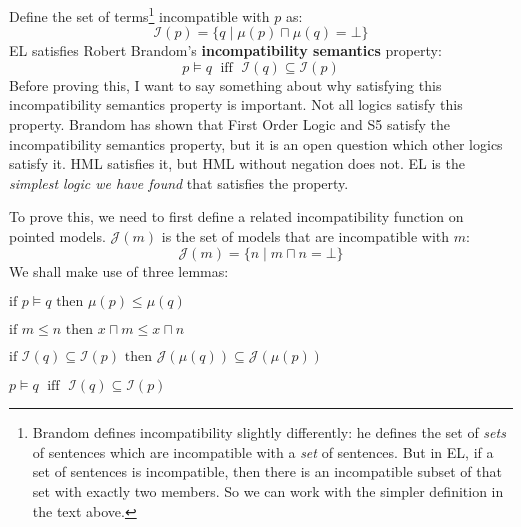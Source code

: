 \documentclass[smallextended]{svjour3}       %
\numberwithin{subcase}{mycase}
\begin{document}
Define the set of terms\footnote{Brandom \cite{brandom} defines incompatibility slightly differently: he defines the set of \emph{sets} of sentences which are incompatible with a \emph{set} of sentences. 
But in EL, if a set of sentences is incompatible, then there is an incompatible subset of that set with exactly two members.
So we can work with the simpler definition in the text above.}
 incompatible with $p$ as:
\[
\mathcal{I}(p) = \{ q \; | \; \mu(p) \sqcap \mu(q) = \bot \}
\]
EL satisfies Robert Brandom's \textbf{incompatibility semantics}  property:
\[
p \models q \; \mbox{ iff } \; \mathcal{I}(q) \subseteq \mathcal{I}(p)
\]
Before proving this, I want to say something about why satisfying this incompatibility semantics property is important.
Not all logics satisfy this property. 
Brandom has shown that First Order Logic and S5 satisfy the incompatibility semantics property, but it is an open question which other logics satisfy it.
HML satisfies it, but HML without negation does not.
EL is the \emph{simplest logic we have found} that satisfies the property.

To prove this, we need to first define a related incompatibility function on pointed models.
$\mathcal{J}(m)$ is the set of models that are incompatible with $m$:
\[
\mathcal{J}(m) = \{ n \; | \; m \sqcap n = \bot \}
\]
We shall make use of three lemmas:
\begin{lemma}
$\mbox{if }p \models q \mbox{ then } \mu(p) \leq \mu(q)$
\end{lemma}
\begin{lemma}
$\mbox{if }m \leq n \mbox{ then } x \sqcap m \leq x \sqcap n$
\end{lemma}
\begin{lemma}
$\mbox{if }\mathcal{I}(q) \subseteq \mathcal{I}(p) \mbox{ then } \mathcal{J}(\mu(q)) \subseteq \mathcal{J}(\mu(p))$
\end{lemma}

\begin{theorem}
$p \models q \; \mbox{ iff } \; \mathcal{I}(q) \subseteq \mathcal{I}(p)$
\end{theorem}
\end{document}
